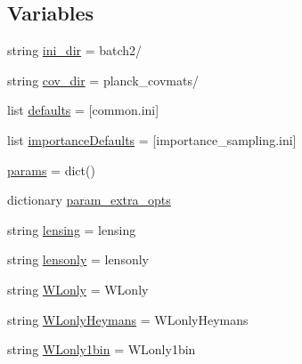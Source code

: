 \subsection*{Variables}
\begin{DoxyCompactItemize}
\item 
string \mbox{\hyperlink{namespaceplanck_1_1settings__planck__2015_a67891180f9aa4d7da7a0ddb4bd4ea16d}{ini\+\_\+dir}} = \textquotesingle{}batch2/\textquotesingle{}
\item 
string \mbox{\hyperlink{namespaceplanck_1_1settings__planck__2015_acef76c1b7b0ce0807f53f29f5a75e80e}{cov\+\_\+dir}} = \textquotesingle{}planck\+\_\+covmats/\textquotesingle{}
\item 
list \mbox{\hyperlink{namespaceplanck_1_1settings__planck__2015_a76020acd97e6bc7d95a924bb809400fb}{defaults}} = \mbox{[}\textquotesingle{}common.\+ini\textquotesingle{}\mbox{]}
\item 
list \mbox{\hyperlink{namespaceplanck_1_1settings__planck__2015_ae56a8f7bb97297941e7f4ceddb730632}{importance\+Defaults}} = \mbox{[}\textquotesingle{}importance\+\_\+sampling.\+ini\textquotesingle{}\mbox{]}
\item 
\mbox{\hyperlink{namespaceplanck_1_1settings__planck__2015_aae27dbb32454bc4c258508d3a36861ce}{params}} = dict()
\item 
dictionary \mbox{\hyperlink{namespaceplanck_1_1settings__planck__2015_ab9d437ebeb1d7fef001d7a985b9e4892}{param\+\_\+extra\+\_\+opts}}
\item 
string \mbox{\hyperlink{namespaceplanck_1_1settings__planck__2015_ad92b077f23ecca52bf992daa771c2686}{lensing}} = \textquotesingle{}lensing\textquotesingle{}
\item 
string \mbox{\hyperlink{namespaceplanck_1_1settings__planck__2015_ae18f99e2ee5bb1edb40d2fff4be0ef68}{lensonly}} = \textquotesingle{}lensonly\textquotesingle{}
\item 
string \mbox{\hyperlink{namespaceplanck_1_1settings__planck__2015_a4a0dbeb7aaf6fe5d901ed83b6e9a5d9f}{W\+Lonly}} = \textquotesingle{}W\+Lonly\textquotesingle{}
\item 
string \mbox{\hyperlink{namespaceplanck_1_1settings__planck__2015_aff189da87d173397cc11341e11460b3f}{W\+Lonly\+Heymans}} = \textquotesingle{}W\+Lonly\+Heymans\textquotesingle{}
\item 
string \mbox{\hyperlink{namespaceplanck_1_1settings__planck__2015_aa4e312eadc0469d0163f9c71ebf8b7a4}{W\+Lonly1bin}} = \textquotesingle{}W\+Lonly1bin\textquotesingle{}
\item 

\end{DoxyCompactItemize}
